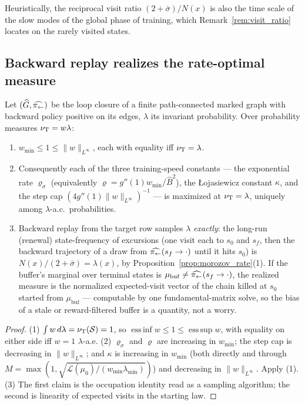 Heuristically, the reciprocal visit ratio $(2+\bar\sigma)/N(x)$ is also the time scale of
the slow modes of the global phase of training, which Remark~\ref{rem:visit_ratio} locates
on the rarely visited states.

\subsection{Backward replay realizes the rate-optimal measure}\label{sec:backward_replay}

\begin{proposition}\label{prop:backward_replay}
Let $(\widehat G,\widehat{\pi_{\leftarrow}})$ be the loop closure of a finite path-connected
marked graph with backward policy positive on its edges, $\lambda$ its invariant
probability. Over probability measures $\nu_{\mathrm{T}}=w\lambda$:
\begin{enumerate}
    \item $w_{\min}\leq1\leq\|w\|_{L^\infty}$, each with equality iff $\nu_{\mathrm{T}}=\lambda$.
    \item Consequently each of the three training-speed constants --- the
    exponential rate $\varrho_\sigma$ (equivalently $\varrho=g''(1)w_{\min}/\widehat B^2$),
    the \L ojasiewicz constant $\kappa$, and the step cap
    $(4g''(1)\|w\|_{L^\infty})^{-1}$ --- is maximized at $\nu_{\mathrm{T}}=\lambda$, uniquely
    among $\lambda$-a.c.\ probabilities.
    \item Backward replay from the target row samples $\lambda$ \emph{exactly}: the
    long-run (renewal) state-frequency of excursions (one visit each to $s_0$ and $s_f$,
    then the backward trajectory of a draw from
    $\widehat{\pi_{\leftarrow}}(s_f\rightarrow\cdot)$ until it hits $s_0$) is
    $N(x)/(2+\bar\sigma)=\lambda(x)$, by Proposition~\ref{prop:morozov_rate}(1). If the
    buffer's marginal over terminal states is
    $\mu_{\mathrm{buf}}\neq\widehat{\pi_{\leftarrow}}(s_f\rightarrow\cdot)$,
    the realized measure is the normalized expected-visit vector of the chain killed at
    $s_0$ started from $\mu_{\mathrm{buf}}$ --- computable by one fundamental-matrix
    solve, so the bias of a stale or reward-filtered buffer is a quantity, not a worry.
\end{enumerate}
\end{proposition}

\begin{proof}
(1) $\int w\,d\lambda=\nu_{\mathrm{T}}(\mathcal S)=1$, so $\operatorname*{ess\,inf}w\leq1\leq
\operatorname*{ess\,sup}w$, with equality on either side iff $w=1$ $\lambda$-a.e.
(2) $\varrho_\sigma$ and $\varrho$ are increasing in $w_{\min}$; the step cap is
decreasing in $\|w\|_{L^\infty}$; and $\kappa$ is increasing in $w_{\min}$ (both directly
and through $M=\max(1,\sqrt{\mathcal L(\mu_0)/(w_{\min}\lambda_{\min})})$) and decreasing
in $\|w\|_{L^\infty}$. Apply (1).
(3) The first claim is the occupation identity read as a sampling algorithm; the second
is linearity of expected visits in the starting law.
\end{proof}

